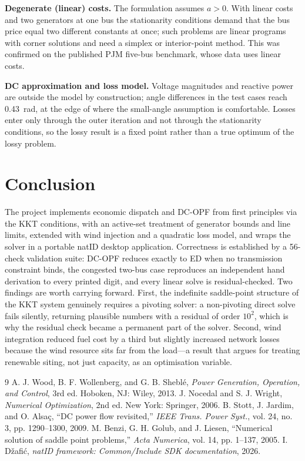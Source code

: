 \documentclass[conference]{IEEEtran}
\begin{document}
\textbf{Degenerate (linear) costs.} The formulation assumes $a>0$. With linear costs and two generators at one bus the stationarity conditions demand that the bus price equal two different constants at once; such problems are linear programs with corner solutions and need a simplex or interior-point method. This was confirmed on the published PJM five-bus benchmark, whose data uses linear costs.

\textbf{DC approximation and loss model.} Voltage magnitudes and reactive power are outside the model by construction; angle differences in the test cases reach 0.43~rad, at the edge of where the small-angle assumption is comfortable. Losses enter only through the outer iteration and not through the stationarity conditions, so the lossy result is a fixed point rather than a true optimum of the lossy problem.

\section{Conclusion}
The project implements economic dispatch and DC-OPF from first principles via the KKT conditions, with an active-set treatment of generator bounds and line limits, extended with wind injection and a quadratic loss model, and wraps the solver in a portable natID desktop application. Correctness is established by a 56-check validation suite: DC-OPF reduces exactly to ED when no transmission constraint binds, the congested two-bus case reproduces an independent hand derivation to every printed digit, and every linear solve is residual-checked. Two findings are worth carrying forward. First, the indefinite saddle-point structure of the KKT system genuinely requires a pivoting solver: a non-pivoting direct solve fails silently, returning plausible numbers with a residual of order $10^2$, which is why the residual check became a permanent part of the solver. Second, wind integration reduced fuel cost by a third but slightly increased network losses because the wind resource sits far from the load---a result that argues for treating renewable siting, not just capacity, as an optimisation variable.

\begin{thebibliography}{9}
 A. J. Wood, B. F. Wollenberg, and G. B. Shebl\'e, \emph{Power Generation, Operation, and Control}, 3rd ed. Hoboken, NJ: Wiley, 2013.
 J. Nocedal and S. J. Wright, \emph{Numerical Optimization}, 2nd ed. New York: Springer, 2006.
 B. Stott, J. Jardim, and O. Alsa\c{c}, ``DC power flow revisited,'' \emph{IEEE Trans. Power Syst.}, vol. 24, no. 3, pp. 1290--1300, 2009.
 M. Benzi, G. H. Golub, and J. Liesen, ``Numerical solution of saddle point problems,'' \emph{Acta Numerica}, vol. 14, pp. 1--137, 2005.
 I. D\v{z}afi\'c, \emph{natID framework: Common/Include SDK documentation}, 2026.
\end{thebibliography}
\end{document}
